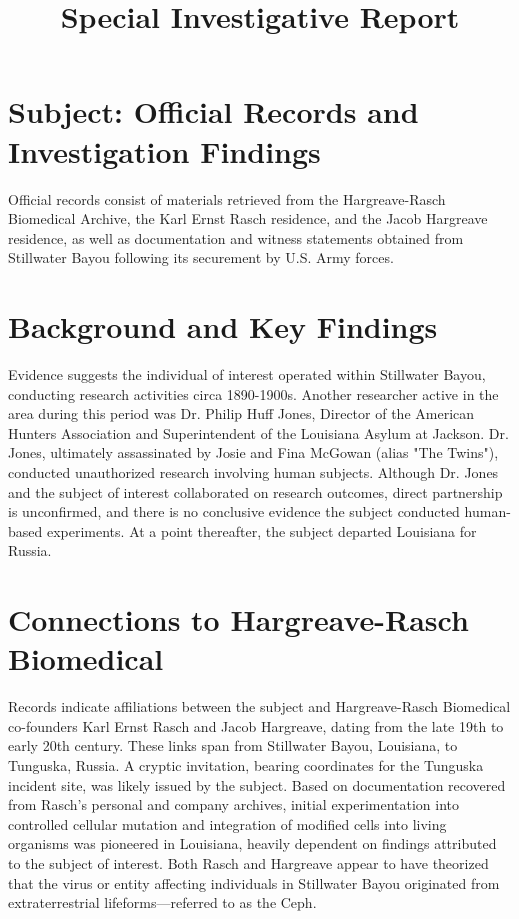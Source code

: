\documentclass{article}
\title{\textbf{Special Investigative Report}}
\date{}
\begin{document}
	\pagestyle{empty}
	
	\maketitle
	
	\section*{Subject: Official Records and Investigation Findings}
	
	Official records consist of materials retrieved from the Hargreave-Rasch Biomedical Archive, the Karl Ernst Rasch residence, and the Jacob Hargreave residence, as well as documentation and witness statements obtained from Stillwater Bayou following its securement by U.S. Army forces.
	
	\section*{Background and Key Findings}
	
	Evidence suggests the individual of interest operated within Stillwater Bayou, conducting research activities circa 1890-1900s. Another researcher active in the area during this period was Dr. Philip Huff Jones, Director of the American Hunters Association and Superintendent of the Louisiana Asylum at Jackson. Dr. Jones, ultimately assassinated by Josie and Fina McGowan (alias "The Twins"), conducted unauthorized research involving human subjects. Although Dr. Jones and the subject of interest collaborated on research outcomes, direct partnership is unconfirmed, and there is no conclusive evidence the subject conducted human-based experiments. At a point thereafter, the subject departed Louisiana for Russia.
	
	\section*{Connections to Hargreave-Rasch Biomedical}
	
	Records indicate affiliations between the subject and Hargreave-Rasch Biomedical co-founders Karl Ernst Rasch and Jacob Hargreave, dating from the late 19th to early 20th century. These links span from Stillwater Bayou, Louisiana, to Tunguska, Russia. A cryptic invitation, bearing coordinates for the Tunguska incident site, was likely issued by the subject. Based on documentation recovered from Rasch’s personal and company archives, initial experimentation into controlled cellular mutation and integration of modified cells into living organisms was pioneered in Louisiana, heavily dependent on findings attributed to the subject of interest. Both Rasch and Hargreave appear to have theorized that the virus or entity affecting individuals in Stillwater Bayou originated from extraterrestrial lifeforms—referred to as the Ceph.
	
\end{document}
